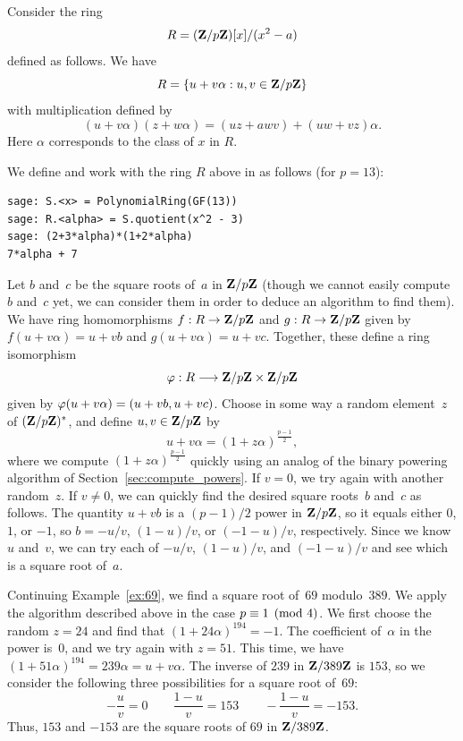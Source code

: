 Consider the ring
$$R = (\mathbf{Z}/p\mathbf{Z}{})[x]/(x^2 - a)$$
defined as follows.
We have
$$
R = \{ u + v \alpha : u, v \in \mathbf{Z}/p\mathbf{Z}{}\}
$$
with multiplication defined by
$$
(u+v\alpha)(z+w\alpha) = (uz + awv) + (uw+vz)\alpha.
$$
Here $\alpha$ corresponds to the class of $x$ in $R$.
\begin{sg}
We define and work with the ring $R$ above
in \sage as follows (for $p=13$):
\begin{verbatim}
sage: S.<x> = PolynomialRing(GF(13))
sage: R.<alpha> = S.quotient(x^2 - 3)
sage: (2+3*alpha)*(1+2*alpha)
7*alpha + 7
\end{verbatim}
\end{sg}


Let $b$ and~$c$ be the square roots of~$a$ in $\mathbf{Z}/p\mathbf{Z}{}$
(though we cannot easily
compute~$b$ and~$c$ yet, we can consider them in order
to deduce an algorithm to find them).
We have ring homomorphisms
$f:R\to \mathbf{Z}/p\mathbf{Z}{}$ and $g:R\to \mathbf{Z}/p\mathbf{Z}{}$
given by $f(u+v\alpha) = u+vb$ and $g(u+v\alpha) = u + vc$.
Together, these define a ring isomorphism
$$
  \varphi : R \longrightarrow \mathbf{Z}/p\mathbf{Z}{} \times \mathbf{Z}/p\mathbf{Z}{}
$$
given by $\varphi(u+v\alpha) = (u+vb,u+vc)$.
Choose in some way a random element~$z$ of $(\mathbf{Z}/p\mathbf{Z}{})^*$, and
define $u,v\in\mathbf{Z}/p\mathbf{Z}{}$ by
$$
u+v\alpha = (1+z\alpha)^{\frac{p-1}{2}},
$$
where we compute $(1+z\alpha)^{\frac{p-1}{2}}$ quickly
using an analog of the
binary powering algorithm of Section~\ref{sec:compute_powers}.
If $v=0$, we try again with another random~$z$.  If $v\neq 0$, we can
quickly find the desired square roots~$b$ and~$c$ as follows.  The
quantity $u+vb$ is a $(p-1)/2$ power in $\mathbf{Z}/p\mathbf{Z}{}$, so it equals
either $0$, $1$, or $-1$, so $b = -u/v$, $(1-u)/v$, or $(-1-u)/v$,
respectively.  Since we know~$u$ and~$v$, we can try each of $-u/v$,
$(1-u)/v$, and $(-1-u)/v$ and see which is a square root of~$a$.

\begin{example}\label{ex:69sqrt}
Continuing Example~\ref{ex:69},
we find a square root of~$69$ modulo~$389$.
We apply the algorithm described above in the case $p\equiv 1\pmod{4}$.
We first choose the random $z=24$ and find that
$
 (1+24\alpha)^{194} = -1.
$
The coefficient of~$\alpha$ in the power is~$0$, and we try again with
$z=51$.
This time, we have $(1+51\alpha)^{194} = 239\alpha = u +v\alpha$.
The inverse of $239$ in $\mathbf{Z}/389\mathbf{Z}{}$ is $153$, so we consider the
following three possibilities for a square root of~$69$:
$$
  -\frac{u}{v} = 0 \qquad
  \frac{1-u}{v} = 153\qquad
  -\frac{1-u}{v} = -153.
$$
Thus, $153$ and $-153$ are the square roots of $69$ in $\mathbf{Z}/389\mathbf{Z}{}$.
\end{example}

